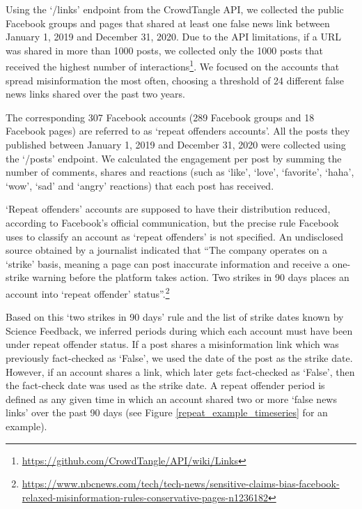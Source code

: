 \documentclass[11pt,a4paper]{article}
\begin{document}
Using the `/links' endpoint from the CrowdTangle API, we collected the public Facebook groups and pages that shared at least one false news link between January 1, 2019 and December 31, 2020. 
Due to the API limitations, if a URL was shared in more than 1000 posts, we collected only the 1000 posts that received the highest number of interactions\footnote{\href{https://github.com/CrowdTangle/API/wiki/Links}{https://github.com/CrowdTangle/API/wiki/Links}}. 
We focused on the accounts that spread misinformation the most often, choosing a threshold of 24 different false news links shared over the past two years.  

The corresponding 307 Facebook accounts (289 Facebook groups and 18 Facebook pages) are referred to as `repeat offenders accounts'. 
All the posts they published between January 1, 2019 and December 31, 2020 were collected using the `/posts' endpoint. 
We calculated the engagement per post by summing the number of comments, shares and reactions (such as ‘like’, ‘love’, ‘favorite’, ‘haha’, ‘wow’, ‘sad’ and ‘angry’ reactions) that each post has received.

`Repeat offenders' accounts are supposed to have their distribution reduced, according to Facebook's official communication, but the precise rule Facebook uses to classify an account as `repeat offenders' is not specified. 
An undisclosed source obtained by a journalist indicated that ``The company operates on a `strike' basis, meaning a page can post inaccurate information and receive a one-strike warning before the platform takes action. 
Two strikes in 90 days places an account into `repeat offender' status''.\footnote{\href{https://www.nbcnews.com/tech/tech-news/sensitive-claims-bias-facebook-relaxed-misinformation-rules-conservative-pages-n1236182}{https://www.nbcnews.com/tech/tech-news/sensitive-claims-bias-facebook-relaxed-misinformation-rules-conservative-pages-n1236182}}

Based on this `two strikes in 90 days' rule and the list of strike dates known by Science Feedback, we inferred periods during which each account must have been under repeat offender status. 
If a post shares a misinformation link which was previously fact-checked as `False', we used the date of the post as the strike date. 
However, if an account shares a link, which later gets fact-checked as `False', then the fact-check date was used as the strike date. 
A repeat offender period is defined as any given time in which an account shared two or more `false news links' over the past 90 days (see Figure \ref{repeat_example_timeseries} for an example).
\end{document}
